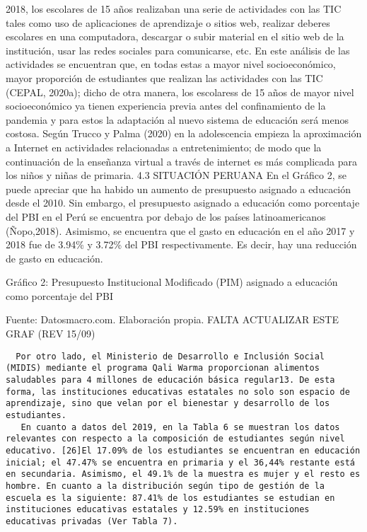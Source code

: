 2018, los escolares de 15 años realizaban una serie de actividades con
las TIC tales como uso de aplicaciones de aprendizaje o sitios web,
realizar deberes escolares en una computadora, descargar o subir
material en el sitio web de la institución, usar las redes sociales para
comunicarse, etc. En este análisis de las actividades se encuentran que,
en todas estas a mayor nivel socioeconómico, mayor proporción de
estudiantes que realizan las actividades con las TIC (CEPAL, 2020a);
dicho de otra manera, los escolaress de 15 años de mayor nivel
socioeconómico ya tienen experiencia previa antes del confinamiento de
la pandemia y para estos la adaptación al nuevo sistema de educación
será menos costosa. Según Trucco y Palma (2020) en la adolescencia
empieza la aproximación a Internet en actividades relacionadas a
entretenimiento; de modo que la continuación de la enseñanza virtual a
través de internet es más complicada para los niños y niñas de primaria.
4.3 SITUACIÓN PERUANA En el Gráfico 2, se puede apreciar que ha habido
un aumento de presupuesto asignado a educación desde el 2010. Sin
embargo, el presupuesto asignado a educación como porcentaje del PBI en
el Perú se encuentra por debajo de los países latinoamericanos
(Ñopo,2018). Asimismo, se encuentra que el gasto en educación en el año
2017 y 2018 fue de 3.94\% y 3.72\% del PBI respectivamente. Es decir,
hay una reducción de gasto en educación.

Gráfico 2: Presupuesto Institucional Modificado (PIM) asignado a
educación como porcentaje del PBI

Fuente: Datosmacro.com. Elaboración propia. FALTA ACTUALIZAR ESTE GRAF
(REV 15/09)

\begin{verbatim}
  Por otro lado, el Ministerio de Desarrollo e Inclusión Social (MIDIS) mediante el programa Qali Warma proporcionan alimentos saludables para 4 millones de educación básica regular13. De esta forma, las instituciones educativas estatales no solo son espacio de aprendizaje, sino que velan por el bienestar y desarrollo de los estudiantes. 
   En cuanto a datos del 2019, en la Tabla 6 se muestran los datos relevantes con respecto a la composición de estudiantes según nivel educativo. [26]El 17.09% de los estudiantes se encuentran en educación inicial; el 47.47% se encuentra en primaria y el 36,44% restante está en secundaria. Asimismo, el 49.1% de la muestra es mujer y el resto es hombre. En cuanto a la distribución según tipo de gestión de la escuela es la siguiente: 87.41% de los estudiantes se estudian en instituciones educativas estatales y 12.59% en instituciones educativas privadas (Ver Tabla 7).
   
\end{verbatim}

